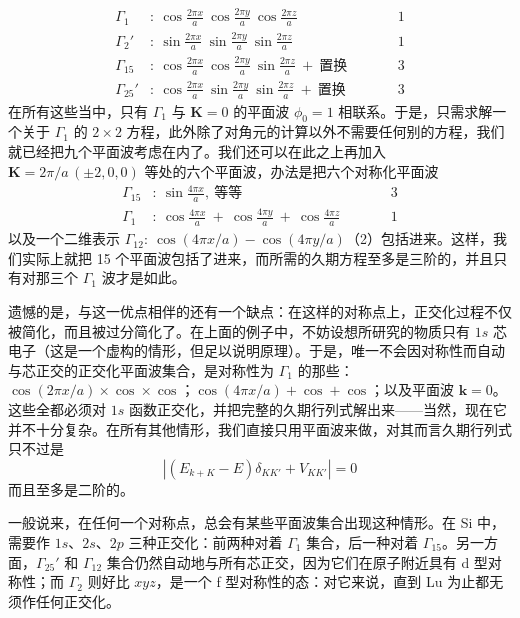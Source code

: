 \begin{align*}
\Gamma_1&:\ \cos\frac{2\pi x}{a}\ \cos\frac{2\pi y}{a}\ \cos\frac{2\pi z}{a} &&\qquad 1\\
\Gamma_2'&:\ \sin\frac{2\pi x}{a}\ \sin\frac{2\pi y}{a}\ \sin\frac{2\pi z}{a} &&\qquad 1\\
\Gamma_{15}&:\ \cos\frac{2\pi x}{a}\ \cos\frac{2\pi y}{a}\ \sin\frac{2\pi z}{a}\ +\ \text{置换} &&\qquad 3\\
\Gamma_{25}'&:\ \cos\frac{2\pi x}{a}\ \sin\frac{2\pi y}{a}\ \sin\frac{2\pi z}{a}\ +\ \text{置换} &&\qquad 3
\end{align*}
在所有这些当中，只有 $\Gamma_1$ 与 $\mathbf{K}=0$ 的平面波 $\phi_0=1$ 相联系。于是，只需求解一个关于 $\Gamma_1$ 的 $2\times 2$ 方程，此外除了对角元的计算以外不需要任何别的方程，我们就已经把九个平面波考虑在内了。我们还可以在此之上再加入 $\mathbf{K}=2\pi/a\,(\pm 2,0,0)$ 等处的六个平面波，办法是把六个对称化平面波
\begin{align*}
\Gamma_{15}&:\ \sin\frac{4\pi x}{a},\ \text{等等} &&\qquad 3\\
\Gamma_1&:\ \cos\frac{4\pi x}{a}\ +\ \cos\frac{4\pi y}{a}\ +\ \cos\frac{4\pi z}{a} &&\qquad 1
\end{align*}
以及一个二维表示 $\Gamma_{12}:\ \cos(4\pi x/a)-\cos(4\pi y/a)$（2）包括进来。这样，我们实际上就把 15 个平面波包括了进来，而所需的久期方程至多是三阶的，并且只有对那三个 $\Gamma_1$ 波才是如此。

遗憾的是，与这一优点相伴的还有一个缺点：在这样的对称点上，正交化过程不仅被简化，而且被过分简化了。在上面的例子中，不妨设想所研究的物质只有 $1s$ 芯电子（这是一个虚构的情形，但足以说明原理）。于是，唯一不会因对称性而自动与芯正交的正交化平面波集合，是对称性为 $\Gamma_1$ 的那些：$\cos(2\pi x/a)\times\cos\times\cos$；$\cos(4\pi x/a)+\cos+\cos$；以及平面波 $\mathbf{k}=0$。这些全都必须对 $1s$ 函数正交化，并把完整的久期行列式解出来——当然，现在它并不十分复杂。在所有其他情形，我们直接只用平面波来做，对其而言久期行列式只不过是
\begin{equation*}
\left|\left(E_{k+K}-E\right)\delta_{KK'}+V_{KK'}\right|=0
\end{equation*}
而且至多是二阶的。

一般说来，在任何一个对称点，总会有某些平面波集合出现这种情形。在 Si 中，需要作 $1s$、$2s$、$2p$ 三种正交化：前两种对着 $\Gamma_1$ 集合，后一种对着 $\Gamma_{15}$。另一方面，$\Gamma_{25}'$ 和 $\Gamma_{12}$ 集合仍然自动地与所有芯正交，因为它们在原子附近具有 d 型对称性；而 $\Gamma_2$ 则好比 $xyz$，是一个 f 型对称性的态：对它来说，直到 Lu 为止都无须作任何正交化。

